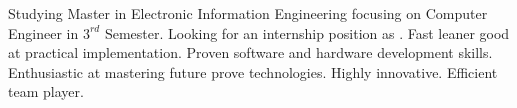 

\begin{cvparagraph}

Studying Master in Electronic Information Engineering focusing on Computer Engineer in $3^{rd}$ Semester. Looking for an internship position as \applicatename. Fast leaner good at practical implementation. Proven software and hardware development skills. Enthusiastic at mastering future prove technologies. Highly innovative. Efficient team player.

\end{cvparagraph}
